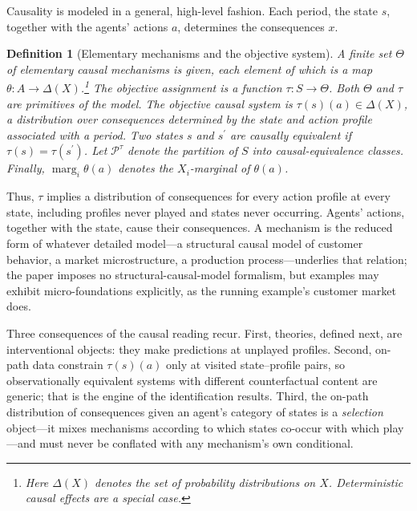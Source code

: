 \documentclass[11pt]{article}
\newtheorem{definition}[assumption]{Definition}
\theoremstyle{definition}
\newcommand{\marg}[1]{\operatorname{marg}_{#1}}
\begin{document}
Causality is modeled in a general, high-level fashion.
Each period, the state \(s\), together with the agents' actions \(a\), determines the consequences \(x\).


\begin{definition}[Elementary mechanisms and the objective system]
\label{def:mechanisms}
A finite set $\Theta$ of \emph{elementary causal mechanisms} is given, each element of which is a map $\theta:A\to\Delta(X)$.\footnote
{
	Here \(\Delta(X)\) denotes the set of probability distributions on \(X\).
	Deterministic causal effects are a special case.
}
The \emph{objective assignment} is a function $\tau:S\to\Theta$.
Both \(\Theta\) and \(\tau\) are primitives of the model.
The \emph{objective causal system} is $\tau(s)(a)\in\Delta(X)$, a distribution over consequences determined by the state and action profile associated with a period.
Two states \(s\) and \(s^\prime\) are \emph{causally equivalent} if $\tau(s)=\tau(s^\prime)$. 
Let $\mathcal P^{\tau}$ denote the partition of $S$ into causal-equivalence classes. 
Finally, $\marg{i}\theta(a)$ denotes the $X_i$-marginal of $\theta(a)$.
\end{definition}

Thus, $\tau$ implies a distribution of consequences for every action profile at every state, including profiles never played and states never occurring.
Agents' actions, together with the state, cause their consequences.
A mechanism is the reduced form of whatever detailed model---a structural causal model of customer behavior, a market microstructure, a production process---underlies that relation; the paper imposes no structural-causal-model formalism, but examples may exhibit micro-foundations explicitly, as the running example's customer market does.

Three consequences of the causal reading recur.
First, theories, defined next, are interventional objects: they make predictions at unplayed profiles.
Second, on-path data constrain $\tau(s)(a)$ only at visited state--profile pairs, so observationally equivalent systems with different counterfactual content are generic; that is the engine of the identification results.
Third, the on-path distribution of consequences given an agent's category of states is a \emph{selection} object---it mixes mechanisms according to which states co-occur with which play---and must never be conflated with any mechanism's own conditional.
\end{document}
